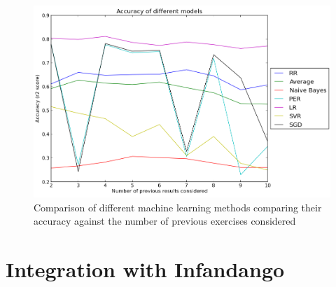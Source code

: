 \begin{figure}[p]
\centering
\includegraphics[width=1\textwidth]{comparison.png}
\caption{Comparison of different machine learning methods comparing their accuracy against the number of previous exercises considered}
\label{fig:comparison}
\end{figure}


\section{Integration with Infandango}

